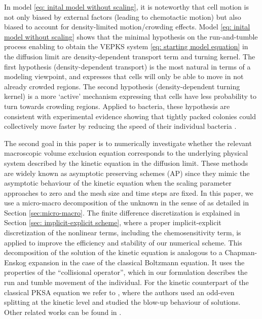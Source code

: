 \documentclass{aims} %
\theoremstyle{definition}
\begin{document}
{In model \eqref{eq: inital model without scaling}, it is noteworthy that cell motion is not only biased by external factors (leading to chemotactic motion) but also biased to account for density-limited motion/crowding effects. Model \eqref{eq: inital model without scaling} shows that the minimal hypothesis on the run-and-tumble process enabling to obtain the VEPKS system \eqref{eq: starting model equation} in the diffusion limit are density-dependent transport term and turning kernel. The first hypothesis (density-dependent transport) is the most natural in terms of a modeling viewpoint, and expresses that cells will only be able to move in not already crowded regions. The second hypothesis (density-dependent turning kernel) is a more `active' mechanism expressing that cells have less probability to turn towards crowding regions. Applied to bacteria, these hypothesis are consistent with experimental evidence showing that tightly packed colonies could collectively move faster by reducing the speed of their individual bacteria \cite{Meacock2021}.} 

The second goal in this paper is to numerically investigate whether the relevant macroscopic volume exclusion equation corresponds to the underlying physical system described by the kinetic equation {in the diffusion limit}. These methods are widely known as asymptotic preserving schemes (AP) \cite{filbet2010class,jin1999efficient} since they mimic the asymptotic behaviour of the kinetic equation when the scaling parameter approaches to zero and the mesh size and time steps are fixed. In this paper, we use a micro-macro decomposition of the unknown in the sense of  \cite{LemouMieussens} as detailed in Section \ref{sec:micro-macro}. {The finite difference discretization is explained in Section  \ref{sec: implicit-explicit scheme}, where a proper implicit-explicit discretization of the nonlinear terms, including the chemosensitivity term, is applied to improve the efficiency and stability of our numerical scheme.} This decomposition of the solution of the kinetic equation is analogous to a Chapman-Enskog expansion in the case of the classical Boltzmann equation. It uses the properties of the ``collisional operator'', which in our formulation describes the run and tumble movement of the individual. For the kinetic counterpart of the classical PKSA equation we refer to \cite{carrillo2013asymptotic}, where the authors used an odd-even splitting at the kinetic level and studied {the blow-up behaviour of solutions.}
Other related works can be found in \cite{chertock2019high,emako2016well,jin2011class,wang2019asymptotic}. 
\end{document}
